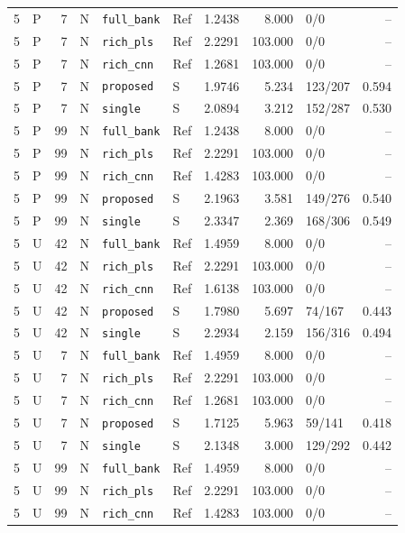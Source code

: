 \documentclass[10pt,a4paper]{article}
\begin{document}
\begin{longtable}{rlrlllrrlr}
5 & P & 7 & N & \texttt{full\_bank} & Ref & 1.2438 & 8.000 & 0/0 & -- \\
5 & P & 7 & N & \texttt{rich\_pls} & Ref & 2.2291 & 103.000 & 0/0 & -- \\
5 & P & 7 & N & \texttt{rich\_cnn} & Ref & 1.2681 & 103.000 & 0/0 & -- \\
5 & P & 7 & N & \texttt{proposed} & S & 1.9746 & 5.234 & 123/207 & 0.594 \\
5 & P & 7 & N & \texttt{single} & S & 2.0894 & 3.212 & 152/287 & 0.530 \\
5 & P & 99 & N & \texttt{full\_bank} & Ref & 1.2438 & 8.000 & 0/0 & -- \\
5 & P & 99 & N & \texttt{rich\_pls} & Ref & 2.2291 & 103.000 & 0/0 & -- \\
5 & P & 99 & N & \texttt{rich\_cnn} & Ref & 1.4283 & 103.000 & 0/0 & -- \\
5 & P & 99 & N & \texttt{proposed} & S & 2.1963 & 3.581 & 149/276 & 0.540 \\
5 & P & 99 & N & \texttt{single} & S & 2.3347 & 2.369 & 168/306 & 0.549 \\
5 & U & 42 & N & \texttt{full\_bank} & Ref & 1.4959 & 8.000 & 0/0 & -- \\
5 & U & 42 & N & \texttt{rich\_pls} & Ref & 2.2291 & 103.000 & 0/0 & -- \\
5 & U & 42 & N & \texttt{rich\_cnn} & Ref & 1.6138 & 103.000 & 0/0 & -- \\
5 & U & 42 & N & \texttt{proposed} & S & 1.7980 & 5.697 & 74/167 & 0.443 \\
5 & U & 42 & N & \texttt{single} & S & 2.2934 & 2.159 & 156/316 & 0.494 \\
5 & U & 7 & N & \texttt{full\_bank} & Ref & 1.4959 & 8.000 & 0/0 & -- \\
5 & U & 7 & N & \texttt{rich\_pls} & Ref & 2.2291 & 103.000 & 0/0 & -- \\
5 & U & 7 & N & \texttt{rich\_cnn} & Ref & 1.2681 & 103.000 & 0/0 & -- \\
5 & U & 7 & N & \texttt{proposed} & S & 1.7125 & 5.963 & 59/141 & 0.418 \\
5 & U & 7 & N & \texttt{single} & S & 2.1348 & 3.000 & 129/292 & 0.442 \\
5 & U & 99 & N & \texttt{full\_bank} & Ref & 1.4959 & 8.000 & 0/0 & -- \\
5 & U & 99 & N & \texttt{rich\_pls} & Ref & 2.2291 & 103.000 & 0/0 & -- \\
5 & U & 99 & N & \texttt{rich\_cnn} & Ref & 1.4283 & 103.000 & 0/0 & -- \\

\end{longtable}
\end{document}
